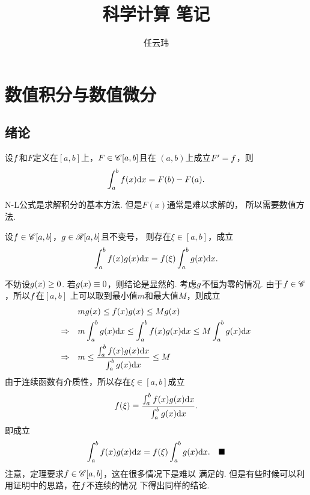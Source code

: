 

\title{科学计算 笔记}
\author{任云玮}
\date{}


\maketitle
\tableofcontents
\newpage


\newpage


\newpage


\newpage


\newpage
\section{数值积分与数值微分}
\subsection{绪论}
  \begin{thm}[N-L公式]
    设$\mathnormal{f}$和$F$定义在$[a, b]$上，$F \in \mathscr{C}[a, b]$且在
    $(a, b)$上成立$F^\prime=\mathnormal{f}$，则
    \[
      \int_a^b \mathnormal{f}(x)\mathrm{d} x = F(b) - F(a).
    \]
  \end{thm}
  \remark
    N-L公式是求解积分的基本方法. 但是$F(x)$通常是难以求解的，
    所以需要数值方法.

  \begin{thm}[积分第一中值定理]
    \label{thm: 积分第一中值定理}
    设$\mathnormal{f}\in\mathscr{C}[a, b]$，$\mathnormal{g}\in\mathscr{R}[a, b]$且不变号，
    则存在$\xi\in[a, b]$，成立
    \[
      \int_a^b\mathnormal{f}(x)\mathnormal{g}(x)\mathrm{d} x = \mathnormal{f}(\xi)\int_a^b\mathnormal{g}(x)\mathrm{d} x.
    \]
  \end{thm}
  \proof
    不妨设$\mathnormal{g}(x)\ge 0$. 若$\mathnormal{g}(x)\equiv 0$，则结论是显然的.
    考虑$\mathnormal{g}$不恒为零的情况. 由于$\mathnormal{f}\in\mathscr{C}$，所以$\mathnormal{f}$在$[a,b]$
    上可以取到最小值$m$和最大值$M$，则成立
    \[\begin{split}
      & m\mathnormal{g}(x) \le \mathnormal{f}(x)\mathnormal{g}(x) \le M\mathnormal{g}(x) \\
      \Rightarrow \quad &
      m\int_a^b\mathnormal{g}(x)\mathrm{d} x \le \int_a^b\mathnormal{f}(x)\mathnormal{g}(x)\mathrm{d} x
      \le M\int_a^b\mathnormal{g}(x)\mathrm{d} x \\
      \Rightarrow \quad &
      m \le \frac{\int_a^b\mathnormal{f}(x)\mathnormal{g}(x)\mathrm{d} x}{\int_a^b\mathnormal{g}(x)\mathrm{d} x}
      \le M
    \end{split}\]
    由于连续函数有介质性，所以存在$\xi\in[a, b]$成立
    \[
      \mathnormal{f}(\xi) = \frac{\int_a^b\mathnormal{f}(x)\mathnormal{g}(x)\mathrm{d} x}{\int_a^b\mathnormal{g}(x)\mathrm{d} x}.
    \]
    即成立
    \[
      \int_a^b\mathnormal{f}(x)\mathnormal{g}(x)\mathrm{d} x = \mathnormal{f}(\xi)\int_a^b\mathnormal{g}(x)\mathrm{d} x.
      \quad\blacksquare
    \]
  \remark
    注意，定理要求$\mathnormal{f}\in\mathscr{C}[a, b]$，这在很多情况下是难以
    满足的. 但是有些时候可以利用证明中的思路，在$\mathnormal{f}$不连续的情况
    下得出同样的结论.

